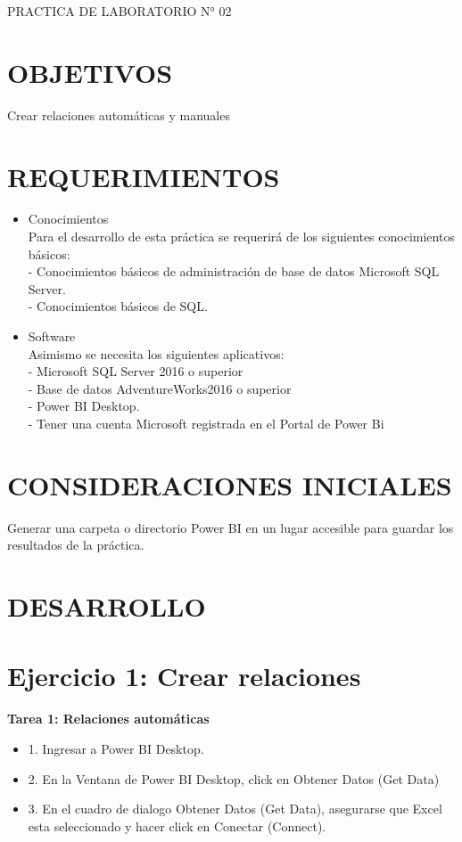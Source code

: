 \begin{center}
    PRACTICA DE LABORATORIO N° 02
\end{center}

\section{OBJETIVOS}
Crear relaciones automáticas y manuales

\section{REQUERIMIENTOS}

\begin{itemize}

\item Conocimientos
\\Para el desarrollo de esta práctica se requerirá de los siguientes conocimientos básicos:
\\- Conocimientos básicos de administración de base de datos Microsoft SQL Server.
\\- Conocimientos básicos de SQL.
\item Software
\\Asimismo se necesita los siguientes aplicativos:
\\- Microsoft SQL Server 2016 o superior
\\- Base de datos AdventureWorks2016 o superior
\\- Power BI Desktop.
\\- Tener una cuenta Microsoft registrada en el Portal de Power Bi
\end{itemize}

\section{CONSIDERACIONES INICIALES}
\item Generar una carpeta o directorio Power BI en un lugar accesible para guardar los resultados de la práctica.

\section{DESARROLLO} 
\section*{Ejercicio 1: Crear relaciones}
\item \textbf{Tarea 1: Relaciones automáticas}
\begin{itemize}
\item  1. Ingresar a Power BI Desktop.
\item  2. En la Ventana de Power BI Desktop, click en Obtener Datos (Get Data)
\item  3. En el cuadro de dialogo Obtener Datos (Get Data), asegurarse que Excel esta seleccionado y hacer click en Conectar (Connect).
\end{itemize} 


